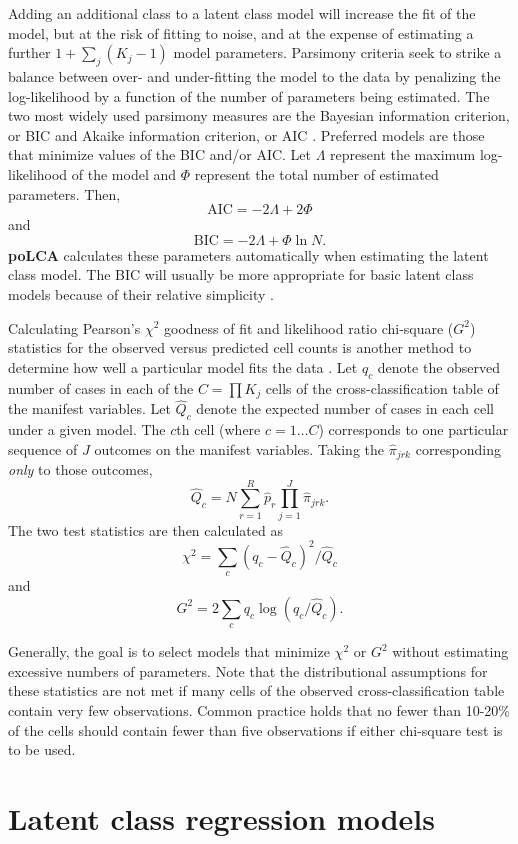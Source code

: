 \documentclass[letterpaper,12pt]{article}
\begin{document}
Adding an additional class to a latent class model will increase the fit of the model, but at the risk of fitting to noise, and at the expense of estimating a further $1+\sum_j(K_j-1)$ model parameters.  Parsimony criteria seek to strike a balance between over- and under-fitting the model to the data by penalizing the log-likelihood by a function of the number of parameters being estimated. The two most widely used parsimony measures are the Bayesian information criterion, or BIC \citep{Schwartz1978} and Akaike information criterion, or AIC \citep{Akaike1973}. Preferred models are those that minimize values of the BIC and/or AIC. Let $\Lambda$ represent the maximum log-likelihood of the model and $\Phi$ represent the total number of estimated parameters.  Then,
$$ \textrm{AIC} = -2 \Lambda + 2 \Phi $$ and
$$ \textrm{BIC} = -2 \Lambda + \Phi \ln N. $$
\textbf{poLCA} calculates these parameters automatically when estimating the latent class model. The BIC will usually be more appropriate for basic latent class models because of their relative simplicity \citep{LinDayton1997, Forster2000}.

Calculating Pearson's $\chi^2$ goodness of fit and likelihood ratio chi-square ($G^2$) statistics for the observed versus predicted cell counts is another method to determine how well a particular model fits the data \citep{Goodman1970}. Let $q_c$ denote the observed number of cases in each of the $C=\prod K_j$ cells of the cross-classification table of the manifest variables. Let $\hat Q_c$ denote the expected number of cases in each cell under a given model. The $c$th cell (where $c=1 \ldots C$) corresponds to one particular sequence of $J$ outcomes on the manifest variables. Taking the $\hat \pi_{jrk}$ corresponding \emph{only} to those outcomes,
$$ \hat Q_c = N \sum_{r=1}^R \hat p_r \prod_{j=1}^J \hat \pi_{jrk}. $$
The two test statistics are then calculated as
$$ \chi^2 = \sum_c (q_c - \hat Q_c)^2 / \hat Q_c $$ and
$$ G^2 = 2 \sum_c q_c \log (q_c/\hat Q_c). $$

Generally, the goal is to select models that minimize $\chi^2$ or $G^2$ without estimating excessive numbers of parameters.  Note that the distributional assumptions for these statistics are not met if many cells of the observed cross-classification table contain very few observations. Common practice holds that no fewer than 10-20\% of the cells should contain fewer than five observations if either chi-square test is to be used.


\section{Latent class regression models}
\end{document}
